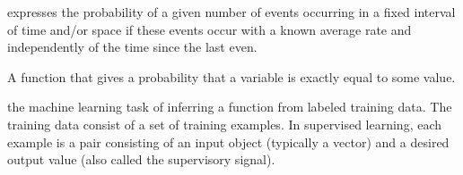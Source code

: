 \begin{definition}
    expresses the probability of a given number of events occurring in a fixed
    interval of time and/or space if these events occur with a known average
    rate and independently of the time since the last even.

\end{definition}

\begin{definition}
    A function that gives a probability that a variable is exactly equal to
    some value.
\end{definition}

\begin{definition}
    the machine learning task of inferring a function from labeled training
    data. The training data consist of a set of training examples. In
    supervised learning, each example is a pair consisting of an input object
    (typically a vector) and a desired output value (also called the
    supervisory signal).

\end{definition}
